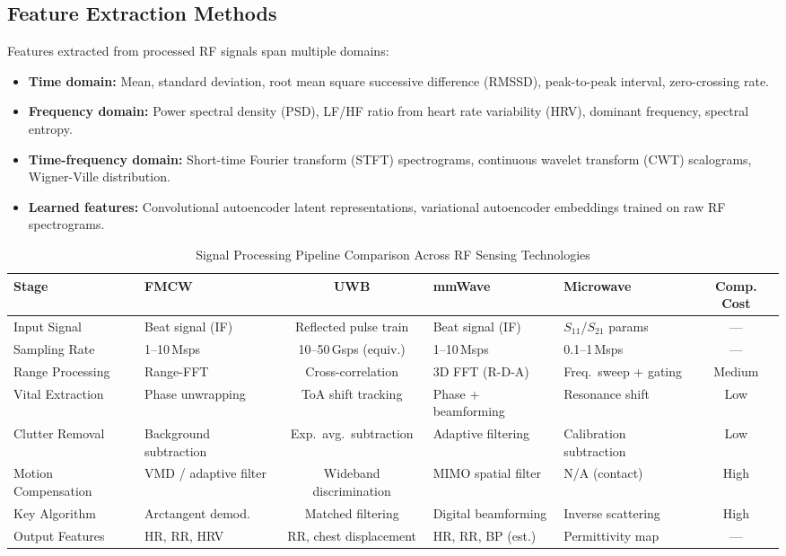 \documentclass[journal,twoside]{IEEEtran}
\begin{document}
\subsection{Feature Extraction Methods}

Features extracted from processed RF signals span multiple domains:
\begin{itemize}
    \item \textbf{Time domain:} Mean, standard deviation, root mean square successive difference (RMSSD), peak-to-peak interval, zero-crossing rate.
    \item \textbf{Frequency domain:} Power spectral density (PSD), LF/HF ratio from heart rate variability (HRV), dominant frequency, spectral entropy.
    \item \textbf{Time-frequency domain:} Short-time Fourier transform (STFT) spectrograms, continuous wavelet transform (CWT) scalograms, Wigner-Ville distribution.
    \item \textbf{Learned features:} Convolutional autoencoder latent representations, variational autoencoder embeddings trained on raw RF spectrograms.
\end{itemize}

\begin{table}[!t]
\centering
\caption{Signal Processing Pipeline Comparison Across RF Sensing Technologies}
\label{tab:signal_processing}
\footnotesize
\begin{tabular}{@{}l L{2.5cm} c L{3cm} L{2.5cm} c@{}}
\toprule
\textbf{Stage} & \textbf{FMCW} & \textbf{UWB} & \textbf{mmWave} & \textbf{Microwave} & \textbf{Comp. Cost} \\
\midrule
Input Signal & Beat signal (IF) & Reflected pulse train & Beat signal (IF) & $S_{11}$/$S_{21}$ params & --- \\
Sampling Rate & 1--10\,Msps & 10--50\,Gsps (equiv.) & 1--10\,Msps & 0.1--1\,Msps & --- \\
Range Processing & Range-FFT & Cross-correlation & 3D FFT (R-D-A) & Freq.\ sweep + gating & Medium \\
Vital Extraction & Phase unwrapping & ToA shift tracking & Phase + beamforming & Resonance shift & Low \\
Clutter Removal & Background subtraction & Exp.\ avg.\ subtraction & Adaptive filtering & Calibration subtraction & Low \\
Motion Compensation & VMD / adaptive filter & Wideband discrimination & MIMO spatial filter & N/A (contact) & High \\
Key Algorithm & Arctangent demod. & Matched filtering & Digital beamforming & Inverse scattering & High \\
Output Features & HR, RR, HRV & RR, chest displacement & HR, RR, BP (est.) & Permittivity map & --- \\
\bottomrule
\end{tabular}
\end{table}
\end{document}

